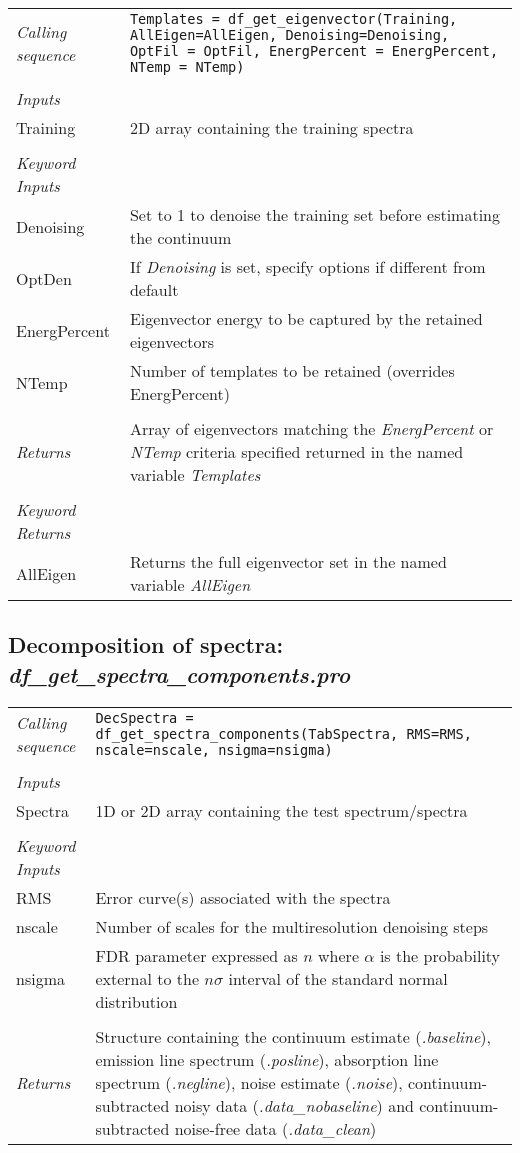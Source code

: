 \documentclass[a4paper]{article}
\begin{document}
\noindent\begin{tabularx}{\textwidth}{LI}
{\em Calling sequence} & \texttt{Templates = df\_get\_eigenvector(Training, AllEigen=AllEigen, Denoising=Denoising, OptFil = OptFil, EnergPercent = EnergPercent, NTemp = NTemp)}\\
 & \\
{\em Inputs} & \\
Training & 2D array containing the training spectra \\
 & \\
{\em Keyword Inputs} & \\
Denoising & Set to 1 to denoise the training set before estimating the continuum \\
OptDen & If {\em Denoising} is set, specify options if different from default \\
EnergPercent & Eigenvector energy to be captured by the retained eigenvectors \\
NTemp & Number of templates to be retained (overrides EnergPercent)\\
 & \\
{\em Returns} & Array of eigenvectors matching the {\em EnergPercent} or {\em NTemp} criteria specified returned in the named variable {\em Templates} \\
& \\
{\em Keyword Returns} & \\
AllEigen & Returns the full eigenvector set in the named variable {\em AllEigen}
\end{tabularx}

\subsection{Decomposition of spectra: {\em df\_get\_spectra\_components.pro}}

\noindent\begin{tabularx}{\textwidth}{LI}
{\em Calling sequence} & \texttt{DecSpectra = df\_get\_spectra\_components(TabSpectra, RMS=RMS, nscale=nscale, nsigma=nsigma)}\\
 & \\
{\em Inputs} & \\
Spectra & 1D or 2D array containing the test spectrum/spectra \\
 & \\
{\em Keyword Inputs} & \\
RMS & Error curve(s) associated with the spectra \\
nscale & Number of scales for the multiresolution denoising steps \\
nsigma & FDR parameter expressed as $n$ where $\alpha$ is the probability external to the $n\sigma$ interval of the standard normal distribution \\
 & \\
{\em Returns} & Structure containing the continuum estimate ({\em .baseline}), emission line spectrum ({\em .posline}), absorption line spectrum ({\em .negline}), noise estimate ({\em .noise}), continuum-subtracted noisy data ({\em .data\_nobaseline}) and continuum-subtracted noise-free data ({\em .data\_clean})
\end{tabularx}
\end{document}
